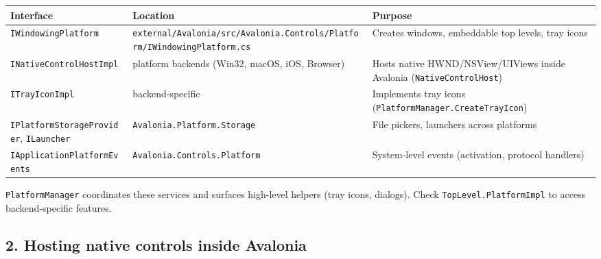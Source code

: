 \begin{longtable}[]{@{}
  >{\raggedright\arraybackslash}p{}
  >{\raggedright\arraybackslash}p{}
  >{\raggedright\arraybackslash}p{}@{}}
\toprule\noalign{}
\begin{minipage}[b]{\linewidth}\raggedright
Interface
\end{minipage} & \begin{minipage}[b]{\linewidth}\raggedright
Location
\end{minipage} & \begin{minipage}[b]{\linewidth}\raggedright
Purpose
\end{minipage} \\
\midrule\noalign{}
\endhead
\bottomrule\noalign{}
\endlastfoot
\passthrough{\lstinline!IWindowingPlatform!} &
\passthrough{\lstinline!external/Avalonia/src/Avalonia.Controls/Platform/IWindowingPlatform.cs!}
& Creates windows, embeddable top levels, tray icons \\
\passthrough{\lstinline!INativeControlHostImpl!} & platform backends
(Win32, macOS, iOS, Browser) & Hosts native HWND/NSView/UIViews inside
Avalonia (\passthrough{\lstinline!NativeControlHost!}) \\
\passthrough{\lstinline!ITrayIconImpl!} & backend-specific & Implements
tray icons (\passthrough{\lstinline!PlatformManager.CreateTrayIcon!}) \\
\passthrough{\lstinline!IPlatformStorageProvider!},
\passthrough{\lstinline!ILauncher!} &
\passthrough{\lstinline!Avalonia.Platform.Storage!} & File pickers,
launchers across platforms \\
\passthrough{\lstinline!IApplicationPlatformEvents!} &
\passthrough{\lstinline!Avalonia.Controls.Platform!} & System-level
events (activation, protocol handlers) \\
\end{longtable}

\passthrough{\lstinline!PlatformManager!} coordinates these services and
surfaces high-level helpers (tray icons, dialogs). Check
\passthrough{\lstinline!TopLevel.PlatformImpl!} to access
backend-specific features.

\subsection{2. Hosting native controls inside
Avalonia}\label{hosting-native-controls-inside-avalonia}

